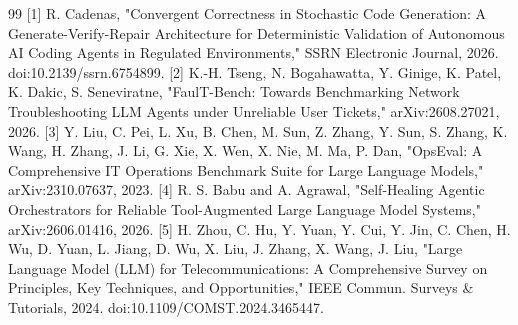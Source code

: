 \documentclass[conference]{IEEEtran}
\begin{document}
\begin{thebibliography}{99}
 [1] R. Cadenas, "Convergent Correctness in Stochastic Code Generation: A Generate-Verify-Repair Architecture for Deterministic Validation of Autonomous AI Coding Agents in Regulated Environments," SSRN Electronic Journal, 2026. doi:10.2139/ssrn.6754899.
 [2] K.-H. Tseng, N. Bogahawatta, Y. Ginige, K. Patel, K. Dakic, S. Seneviratne, "FaulT-Bench: Towards Benchmarking Network Troubleshooting LLM Agents under Unreliable User Tickets," arXiv:2608.27021, 2026.
 [3] Y. Liu, C. Pei, L. Xu, B. Chen, M. Sun, Z. Zhang, Y. Sun, S. Zhang, K. Wang, H. Zhang, J. Li, G. Xie, X. Wen, X. Nie, M. Ma, P. Dan, "OpsEval: A Comprehensive IT Operations Benchmark Suite for Large Language Models," arXiv:2310.07637, 2023.
 [4] R. S. Babu and A. Agrawal, "Self-Healing Agentic Orchestrators for Reliable Tool-Augmented Large Language Model Systems," arXiv:2606.01416, 2026.
 [5] H. Zhou, C. Hu, Y. Yuan, Y. Cui, Y. Jin, C. Chen, H. Wu, D. Yuan, L. Jiang, D. Wu, X. Liu, J. Zhang, X. Wang, J. Liu, "Large Language Model (LLM) for Telecommunications: A Comprehensive Survey on Principles, Key Techniques, and Opportunities," IEEE Commun. Surveys \& Tutorials, 2024. doi:10.1109/COMST.2024.3465447.
\end{thebibliography}
\end{document}
